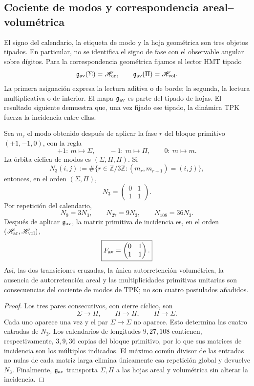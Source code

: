 \subsection{Cociente de modos y correspondencia areal--volumétrica}
\label{p12-83-c16-s2:sec:cociente-modos-fav}

El signo del calendario, la etiqueta de modo y la hoja geométrica son tres
objetos tipados. En particular, no se identifica el signo de fase con el
observable angular sobre dígitos. Para la correspondencia geométrica fijamos el
lector HMT tipado
\[
 \mathfrak g_{\rm av}(\Sigma)=\mathscr H_{\rm ar},
 \qquad
 \mathfrak g_{\rm av}(\Pi)=\mathscr H_{\rm vol}.
\]
La primera asignación expresa la lectura aditiva o de borde; la segunda, la
lectura multiplicativa o de interior. El mapa \(\mathfrak g_{\rm av}\) es
parte del tipado de hojas. El resultado siguiente demuestra que, una vez
fijado ese tipado, la dinámica TPK fuerza la incidencia entre ellas.

\begin{theorem}
\label{p12-83-c16-s2:thm:descenso-necesario-fav}
Sea \(m_r\) el modo obtenido después de aplicar la fase \(r\) del bloque
primitivo \((+1,-1,0)\), con la regla
\[
 +1:\ m\mapsto\Sigma,\qquad
 -1:\ m\mapsto\Pi,\qquad
 0:\ m\mapsto m.
\]
La órbita cíclica de modos es \((\Sigma,\Pi,\Pi)\). Si
\[
 N_3(i,j)
 :=
 \#\{r\in\mathbb Z/3\mathbb Z:(m_r,m_{r+1})=(i,j)\},
\]
entonces, en el orden \((\Sigma,\Pi)\),
\[
 \boxed{
 N_3=
 \begin{pmatrix}0&1\\1&1\end{pmatrix}.}
\]
Por repetición del calendario,
\[
 N_9=3N_3,\qquad N_{27}=9N_3,\qquad N_{108}=36N_3.
\]
Después de aplicar \(\mathfrak g_{\rm av}\), la matriz primitiva de
incidencia es, en el orden
\((\mathscr H_{\rm ar},\mathscr H_{\rm vol})\),
\[
 \boxed{
 F_{\rm av}=
 \begin{pmatrix}0&1\\1&1\end{pmatrix}.}
\]
Así, las dos transiciones cruzadas, la única autorretención volumétrica, la
ausencia de autorretención areal y las multiplicidades primitivas unitarias
son consecuencias del cociente de modos de TPK; no son cuatro postulados
añadidos.
\end{theorem}

\begin{proof}
Los tres pares consecutivos, con cierre cíclico, son
\[
 \Sigma\longrightarrow\Pi,\qquad
 \Pi\longrightarrow\Pi,\qquad
 \Pi\longrightarrow\Sigma.
\]
Cada uno aparece una vez y el par
\(\Sigma\to\Sigma\) no aparece. Esto determina las cuatro entradas de
\(N_3\). Los calendarios de longitudes \(9,27,108\) contienen,
respectivamente, \(3,9,36\) copias del bloque primitivo, por lo que sus
matrices de incidencia son los múltiplos indicados. El máximo común divisor
de las entradas no nulas de cada matriz larga elimina únicamente esa
repetición global y devuelve \(N_3\). Finalmente,
\(\mathfrak g_{\rm av}\) transporta \(\Sigma,\Pi\) a las hojas areal y
volumétrica sin alterar la incidencia.
\end{proof}

